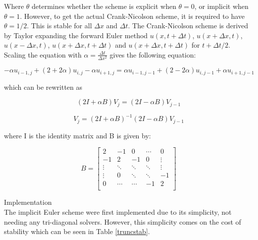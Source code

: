 \documentclass[10pt,a4paper]{article}
\begin{document}
\noindent Where $\theta$ determines whether the scheme is explicit when $\theta = 0$, or implicit when $\theta = 1$. However, to get the actual Crank-Nicolson scheme, it is required to have $\theta = 1/2$. This is stable for all $\Delta x$ and $\Delta t$. The Crank-Nicolson scheme is derived by Taylor expanding the forward Euler method $u(x,t + \Delta t)$, $u(x + \Delta x,t)$, $u(x - \Delta x,t)$, $u(x + \Delta x, t + \Delta t)$ and $u(x + \Delta x, t + \Delta t)$ for $t + \Delta t/2$.\\

\noindent Scaling the equation with $\alpha = \frac{\Delta t}{\Delta x^2}$ gives the following equation:

\begin{equation}
-\alpha u_{i-1,j} + (2 + 2\alpha)u_{i,j} -\alpha u_{i+1,j} = \alpha u_{i-1,j-1} + (2-2\alpha)u_{i,j-1} + \alpha u_{i+1,j-1}
\end{equation}

\noindent which can be rewritten as

\begin{equation}
(2I + \alpha B)V_j = (2I - \alpha B)V_{j-1}
\end{equation}

\begin{equation}
V_j = (2I + \alpha B)^{-1}(2I - \alpha B)V_{j-1}
\end{equation}

\noindent where I is the identity matrix and B is given by:

\begin{equation}
B = \begin{bmatrix}
2 & -1 & 0 & \cdots &0\\
-1 & 2 & -1 & 0 & \vdots\\
\vdots & \ddots & \ddots & \ddots & \vdots\\
\vdots & 0 & \ddots & \ddots & -1\\
0 & \cdots & \cdots & -1 & 2\\
\end{bmatrix}
\end{equation}

\noindent Implementation\\

\noindent The implicit Euler scheme were first implemented due to its simplicity, not needing any tri-diagonal solvers. However, this simplicity comes on the cost of stability which can be seen in Table \ref{truncstab}. 
\end{document}
